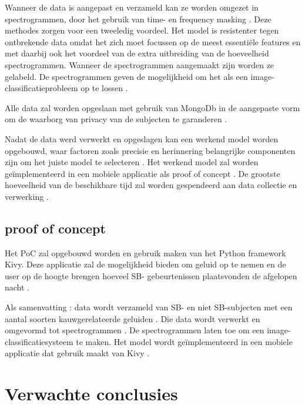 \documentclass{hogent-article}
\begin{document}
\bigbreak
Wanneer de data is aangepast en verzameld kan ze worden omgezet in spectrogrammen, door het gebruik van time- en frequency masking . Deze methodes zorgen voor een tweeledig voordeel.  Het model is resistenter tegen ontbrekende data omdat het zich moet focussen op de meest essentiële features en met daarbij ook het voordeel van de extra uitbreiding van de hoeveelheid spectrogrammen. Wanneer de spectrogrammen  aangemaakt zijn worden ze gelabeld. De spectrogrammen geven de mogelijkheid om het als een image-classiﬁcatieprobleem op te lossen .

\bigbreak
Alle data zal worden opgeslaan met gebruik van MongoDb in de aangepaste vorm om de waarborg van privacy van de subjecten te garanderen .
\bigbreak

Nadat de data werd verwerkt en opgeslagen kan een werkend model worden opgebouwd, waar factoren zoals precisie en herinnering belangrijke componenten zijn om het juiste model te selecteren . Het werkend model zal worden geïmplementeerd in een mobiele applicatie als proof of concept . De grootste hoeveelheid van de beschikbare tijd zal worden gespendeerd aan data collectie en verwerking .


\subsection{proof of concept}

Het PoC zal opgebouwd worden en gebruik maken van het Python framework Kivy. Deze applicatie zal de mogelijkheid bieden om geluid op te nemen en de user op de hoogte brengen hoeveel SB- gebeurtenissen plaatsvonden de afgelopen nacht .


\bigbreak
Als samenvatting :  data wordt verzameld van SB- en niet SB-subjecten met een aantal soorten kauwgerelateerde geluiden . Die data wordt verwerkt en omgevormd tot spectrogrammen .  De spectrogrammen laten toe om een image- classiﬁcatiesysteem te maken. Het model wordt geïmplementeerd in een mobiele applicatie dat gebruik maakt van Kivy .






\section{Verwachte conclusies}

\end{document}
